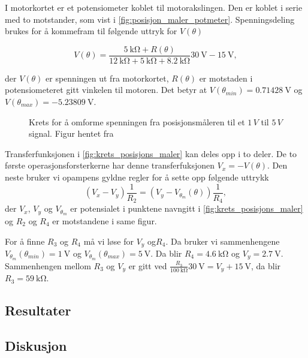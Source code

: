 I motorkortet er et potensiometer koblet til motorakslingen. Den er koblet i serie med to motstander, som vist i \autoref{fig:posisjon_maler_potmeter}. Spenningsdeling brukes for å kommefram til følgende uttryk for $V(\theta)$

\begin{equation}
    \label{eq:V_av_theta}
    V(\theta) = \frac{\SI{5}{\kilo\ohm} + R(\theta)}{\SI{12}{\kilo\ohm} + \SI{5}{\kilo\ohm} + \SI{8.2}{\kilo\ohm}} \SI{30}{\volt} - \SI{15}{\volt},
\end{equation}

der $V(\theta)$ er spenningen ut fra motorkortet, $R(\theta)$ er motstaden i potensiometeret gitt vinkelen til motoren. Det betyr at $V(\theta_{min}) = \SI{0.71428}{\volt}$ og $V(\theta_{max}) =\SI{-5.23809}{\volt}$. 

\begin{figure}[h]
    \centering
    
    \caption{Krets for å omforme spenningen fra posisjonsmåleren til et $1\,V$ til $5\,V$ signal. Figur hentet fra \cite{AnalogMotorlabbOppgaver}}
    \label{fig:krets_posisjons_maler}
\end{figure}

Transferfunksjonen i \autoref{fig:krets_posisjons_maler} kan deles opp i to deler. De to første operasjonsforsterkerne har denne transferfuksjonen $V_x = -V(\theta)$. Den neste bruker vi opampens gyldne regler for å sette opp følgende uttrykk
\begin{equation}
    \label{eq:posisjonmåler_skalering}
    (V_x - V_y) \frac{1}{R_2} = (V_y - V_{\theta_m}(\theta)) \frac{1}{R_4},
\end{equation}
der $V_x$, $V_y$ og $V_{\theta_m}$ er potensialet i punktene navngitt i \autoref{fig:krets_posisjons_maler} og $R_2$ og $R_4$ er motstandene i same figur.

For å finne $R_3$ og $R_4$ må vi løse for $V_y$ og$R_4$. Da bruker vi sammenhengene $V_{\theta_m}(\theta_{min}) = \SI{1}{\volt}$ og $V_{\theta_m}(\theta_{max}) = \SI{5}{\volt}$. Da blir $R_4 = \SI{4.6}{\kilo\ohm}$ og 
$V_y = \SI{2.7}{\volt}$. Sammenhengen mellom $R_3$ og $V_y$ er gitt ved $\frac{R_3}{\SI{100}{\kilo\ohm}} \SI{30}{\volt} = V_y + \SI{15}{\volt}$, da blir $R_3 = \SI{59}{\kilo\ohm}$.

\subsection{Resultater}


\subsection{Diskusjon}

